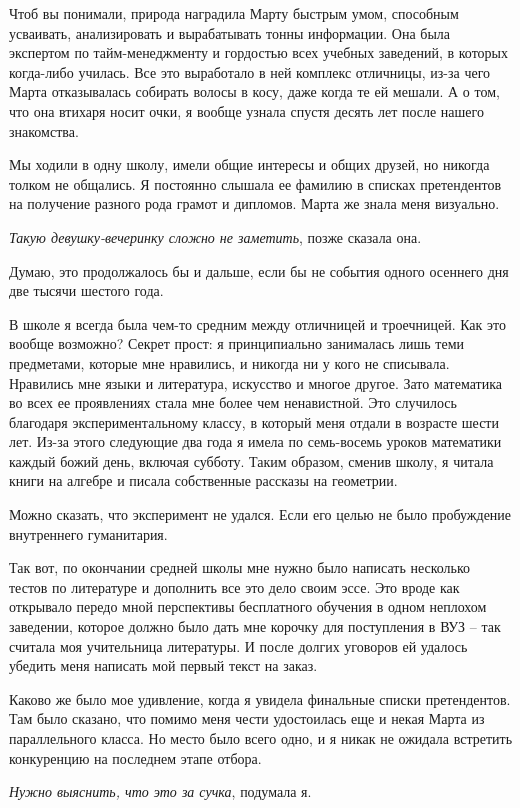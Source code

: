 \documentclass[
]{book}
\begin{document}
Чтоб вы понимали, природа наградила Марту быстрым умом, способным усваивать, анализировать и вырабатывать тонны информации. Она была экспертом по тайм-менеджменту и гордостью всех учебных заведений, в которых когда-либо училась. Все это выработало в ней комплекс отличницы, из-за чего Марта отказывалась собирать волосы в косу, даже когда те ей мешали. А о том, что она втихаря носит очки, я вообще узнала спустя десять лет после нашего знакомства.

Мы ходили в одну школу, имели общие интересы и общих друзей, но никогда толком не общались. Я постоянно слышала ее фамилию в списках претендентов на получение разного рода грамот и дипломов. Марта же знала меня визуально.

\emph{Такую девушку-вечеринку сложно не заметить}, позже сказала она.

Думаю, это продолжалось бы и дальше, если бы не события одного осеннего дня две тысячи шестого года.

В школе я всегда была чем-то средним между отличницей и троечницей. Как это вообще возможно? Секрет прост: я принципиально занималась лишь теми предметами, которые мне нравились, и никогда ни у кого не списывала. Нравились мне языки и литература, искусство и многое другое. Зато математика во всех ее проявлениях стала мне более чем ненавистной. Это случилось благодаря экспериментальному классу, в который меня отдали в возрасте шести лет. Из-за этого следующие два года я имела по семь-восемь уроков математики каждый божий день, включая субботу. Таким образом, сменив школу, я читала книги на алгебре и писала собственные рассказы на геометрии.

Можно сказать, что эксперимент не удался. Если его целью не было пробуждение внутреннего гуманитария.

Так вот, по окончании средней школы мне нужно было написать несколько тестов по литературе и дополнить все это дело своим эссе. Это вроде как открывало передо мной перспективы бесплатного обучения в одном неплохом заведении, которое должно было дать мне корочку для поступления в ВУЗ -- так считала моя учительница литературы. И после долгих уговоров ей удалось убедить меня написать мой первый текст на заказ.

Каково же было мое удивление, когда я увидела финальные списки претендентов. Там было сказано, что помимо меня чести удостоилась еще и некая Марта из параллельного класса. Но место было всего одно, и я никак не ожидала встретить конкуренцию на последнем этапе отбора.

\emph{Нужно выяснить, что это за сучка}, подумала я.
\end{document}

